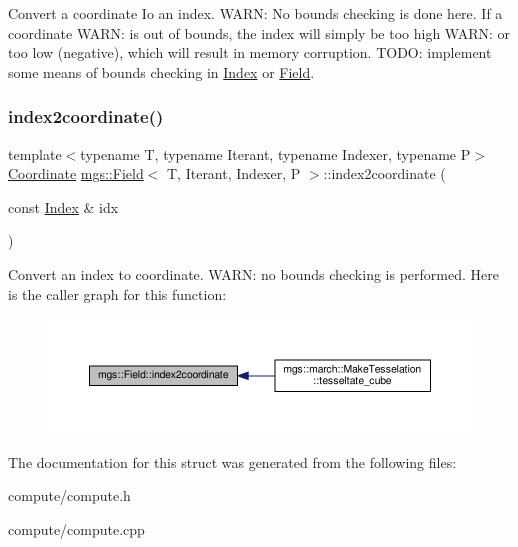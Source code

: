 Convert a coordinate Io an index. W\+A\+RN\+: No bounds checking is done here. If a coordinate W\+A\+RN\+: is out of bounds, the index will simply be too high W\+A\+RN\+: or too low (negative), which will result in memory corruption. T\+O\+DO\+: implement some means of bounds checking in \hyperlink{structmgs_1_1Index}{Index} or \hyperlink{structmgs_1_1Field}{Field}. \mbox{\label{structmgs_1_1Field_a28972ab1f16b45ca949849de53ecf7e7}} 
\subsubsection{\texorpdfstring{index2coordinate()}{index2coordinate()}}
{\footnotesize\ttfamily template$<$typename T, typename Iterant, typename Indexer, typename P$>$ \\
\hyperlink{structmgs_1_1Vector}{Coordinate} \hyperlink{structmgs_1_1Field}{mgs\+::\+Field}$<$ T, Iterant, Indexer, P $>$\+::index2coordinate (\begin{DoxyParamCaption}\item[{const \hyperlink{structmgs_1_1Index}{Index} \&}]{idx }\end{DoxyParamCaption})\hspace{0.3cm}{\ttfamily [inline]}}

Convert an index to coordinate. W\+A\+RN\+: no bounds checking is performed. Here is the caller graph for this function\+:
\nopagebreak
\begin{figure}[H]
\begin{center}
\leavevmode
\includegraphics[width=350pt]{structmgs_1_1Field_a28972ab1f16b45ca949849de53ecf7e7_icgraph}
\end{center}
\end{figure}


The documentation for this struct was generated from the following files\+:\begin{DoxyCompactItemize}
\item 
compute/compute.\+h\item 
compute/compute.\+cpp\end{DoxyCompactItemize}

